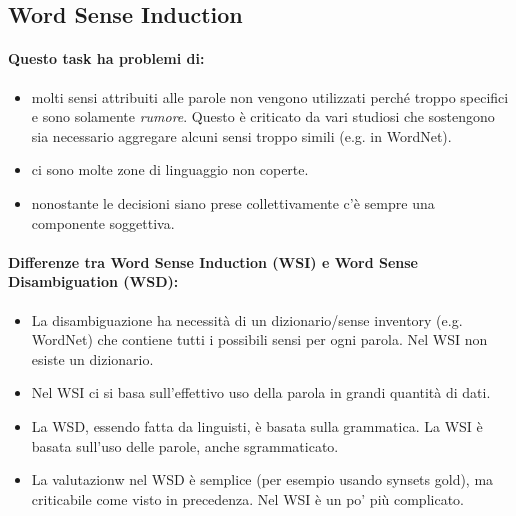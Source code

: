 \subsection{Word Sense Induction}


\paragraph{Questo task ha problemi di:}

\begin{itemize}
  \item {} molti sensi attribuiti alle parole non vengono utilizzati perché troppo specifici e sono solamente \textit{rumore}. Questo è criticato da vari studiosi che sostengono sia necessario aggregare alcuni sensi troppo simili (e.g. in WordNet). 
  \item {} ci sono molte zone di linguaggio non coperte. 
  \item {} nonostante le decisioni siano prese collettivamente c'è  sempre una componente soggettiva.
\end{itemize}

\paragraph{Differenze tra Word Sense Induction (WSI) e Word Sense Disambiguation (WSD):}

\begin{itemize}
  \item La disambiguazione ha necessità di un dizionario/sense inventory (e.g. WordNet) che contiene tutti i possibili sensi per ogni parola. Nel WSI non esiste un dizionario. 
  \item Nel WSI ci si basa sull'effettivo uso della parola in grandi quantità di dati.  
  \item La WSD, essendo fatta da linguisti, è basata sulla grammatica. La WSI è basata sull'uso delle parole, anche sgrammaticato. 
  \item La valutazionw nel WSD è semplice (per esempio usando synsets gold), ma criticabile come visto in precedenza. Nel WSI è un po' più complicato.
\end{itemize}

